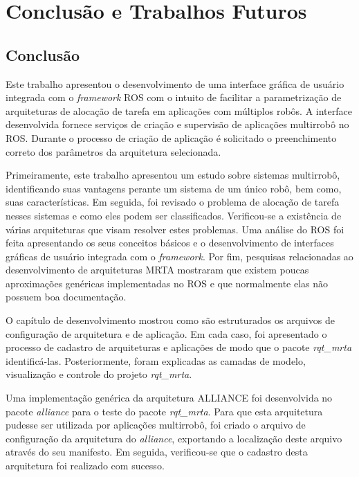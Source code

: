 \chapter[Conclusão e Trabalhos Futuros]{Conclusão e Trabalhos Futuros} \label{cap:conclusao}

    \section{Conclusão}
        Este trabalho apresentou o desenvolvimento de uma interface gráfica de usuário integrada com o \textit{framework} ROS com o intuito de facilitar a parametrização de arquiteturas de alocação de tarefa em aplicações com múltiplos robôs. A interface desenvolvida fornece serviços de criação e supervisão de aplicações multirrobô no ROS. Durante o processo de criação de aplicação é solicitado o preenchimento correto dos parâmetros da arquitetura selecionada. 
        
        Primeiramente, este trabalho apresentou um estudo sobre sistemas multirrobô, identificando suas vantagens perante um sistema de um único robô, bem como, suas características. Em seguida, foi revisado o problema de alocação de tarefa nesses sistemas e como eles podem ser classificados. Verificou-se a existência de várias arquiteturas que visam resolver estes problemas. Uma análise do ROS foi feita apresentando os seus conceitos básicos e o desenvolvimento de interfaces gráficas de usuário integrada com o \textit{framework}. Por fim, pesquisas relacionadas ao desenvolvimento de arquiteturas MRTA mostraram que existem poucas aproximações genéricas implementadas no ROS e que normalmente elas não possuem boa documentação.
        
        O capítulo de desenvolvimento mostrou como são estruturados os arquivos de configuração de arquitetura e de  aplicação. Em cada caso, foi apresentado o processo de cadastro de arquiteturas e aplicações de modo que o pacote \textit{rqt\_mrta} identificá-las. Posteriormente, foram explicadas as camadas de modelo, visualização e controle do projeto \textit{rqt\_mrta}. 
    
        Uma implementação genérica da arquitetura ALLIANCE foi desenvolvida no pacote \textit{alliance} para o teste do pacote \textit{rqt\_mrta}. Para que esta arquitetura pudesse ser utilizada por aplicações multirrobô, foi criado o arquivo de configuração da arquitetura do \textit{alliance}, exportando a localização deste arquivo através do seu manifesto. Em seguida, verificou-se que o cadastro desta arquitetura foi realizado com sucesso.
        
